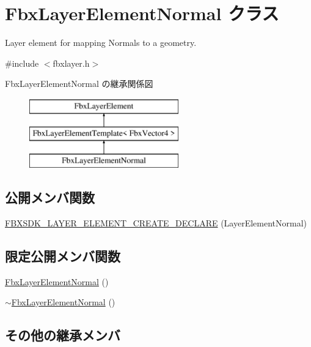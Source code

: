 \hypertarget{class_fbx_layer_element_normal}{}\section{Fbx\+Layer\+Element\+Normal クラス}
\label{class_fbx_layer_element_normal}


Layer element for mapping Normals to a geometry.  




{\ttfamily \#include $<$fbxlayer.\+h$>$}

Fbx\+Layer\+Element\+Normal の継承関係図\begin{figure}[H]
\begin{center}
\leavevmode
\includegraphics[height=3.000000cm]{class_fbx_layer_element_normal}
\end{center}
\end{figure}
\subsection*{公開メンバ関数}
\begin{DoxyCompactItemize}
\item 
\hyperlink{class_fbx_layer_element_normal_a5528c5cfd22f39e2b94fe852c911fbb1}{F\+B\+X\+S\+D\+K\+\_\+\+L\+A\+Y\+E\+R\+\_\+\+E\+L\+E\+M\+E\+N\+T\+\_\+\+C\+R\+E\+A\+T\+E\+\_\+\+D\+E\+C\+L\+A\+RE} (Layer\+Element\+Normal)
\end{DoxyCompactItemize}
\subsection*{限定公開メンバ関数}
\begin{DoxyCompactItemize}
\item 
\hyperlink{class_fbx_layer_element_normal_a08287396add8d7dc98695be459a7697b}{Fbx\+Layer\+Element\+Normal} ()
\item 
\hyperlink{class_fbx_layer_element_normal_abd0cbe65ec982e7486de222a99a8089d}{$\sim$\+Fbx\+Layer\+Element\+Normal} ()
\end{DoxyCompactItemize}
\subsection*{その他の継承メンバ}


